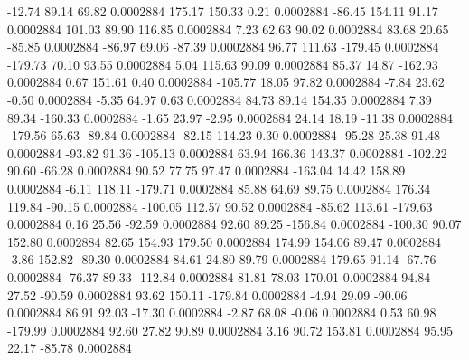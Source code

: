       -12.74       89.14       69.82     0.0002884
      175.17      150.33        0.21     0.0002884
      -86.45      154.11       91.17     0.0002884
      101.03       89.90      116.85     0.0002884
        7.23       62.63       90.02     0.0002884
       83.68       20.65      -85.85     0.0002884
      -86.97       69.06      -87.39     0.0002884
       96.77      111.63     -179.45     0.0002884
     -179.73       70.10       93.55     0.0002884
        5.04      115.63       90.09     0.0002884
       85.37       14.87     -162.93     0.0002884
        0.67      151.61        0.40     0.0002884
     -105.77       18.05       97.82     0.0002884
       -7.84       23.62       -0.50     0.0002884
       -5.35       64.97        0.63     0.0002884
       84.73       89.14      154.35     0.0002884
        7.39       89.34     -160.33     0.0002884
       -1.65       23.97       -2.95     0.0002884
       24.14       18.19      -11.38     0.0002884
     -179.56       65.63      -89.84     0.0002884
      -82.15      114.23        0.30     0.0002884
      -95.28       25.38       91.48     0.0002884
      -93.82       91.36     -105.13     0.0002884
       63.94      166.36      143.37     0.0002884
     -102.22       90.60      -66.28     0.0002884
       90.52       77.75       97.47     0.0002884
     -163.04       14.42      158.89     0.0002884
       -6.11      118.11     -179.71     0.0002884
       85.88       64.69       89.75     0.0002884
      176.34      119.84      -90.15     0.0002884
     -100.05      112.57       90.52     0.0002884
      -85.62      113.61     -179.63     0.0002884
        0.16       25.56      -92.59     0.0002884
       92.60       89.25     -156.84     0.0002884
     -100.30       90.07      152.80     0.0002884
       82.65      154.93      179.50     0.0002884
      174.99      154.06       89.47     0.0002884
       -3.86      152.82      -89.30     0.0002884
       84.61       24.80       89.79     0.0002884
      179.65       91.14      -67.76     0.0002884
      -76.37       89.33     -112.84     0.0002884
       81.81       78.03      170.01     0.0002884
       94.84       27.52      -90.59     0.0002884
       93.62      150.11     -179.84     0.0002884
       -4.94       29.09      -90.06     0.0002884
       86.91       92.03      -17.30     0.0002884
       -2.87       68.08       -0.06     0.0002884
        0.53       60.98     -179.99     0.0002884
       92.60       27.82       90.89     0.0002884
        3.16       90.72      153.81     0.0002884
       95.95       22.17      -85.78     0.0002884
